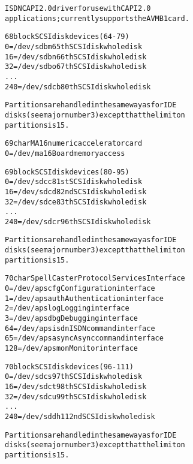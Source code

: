 \documentclass[a4paper,8pt,english]{sphinxmanual}
\begin{document}
\begin{alltt}
                ISDN CAPI 2.0 driver for use with CAPI 2.0
                applications; currently supports the AVM B1 card.

  68 block      SCSI disk devices (64-79)
                  0 = /dev/sdbm         65th SCSI disk whole disk
                 16 = /dev/sdbn         66th SCSI disk whole disk
                 32 = /dev/sdbo         67th SCSI disk whole disk
                    ...
                240 = /dev/sdcb         80th SCSI disk whole disk

                Partitions are handled in the same way as for IDE
                disks (see major number 3) except that the limit on
                partitions is 15.

  69 char       MA16 numeric accelerator card
                  0 = /dev/ma16         Board memory access

  69 block      SCSI disk devices (80-95)
                  0 = /dev/sdcc         81st SCSI disk whole disk
                 16 = /dev/sdcd         82nd SCSI disk whole disk
                 32 = /dev/sdce         83th SCSI disk whole disk
                    ...
                240 = /dev/sdcr         96th SCSI disk whole disk

                Partitions are handled in the same way as for IDE
                disks (see major number 3) except that the limit on
                partitions is 15.

  70 char       SpellCaster Protocol Services Interface
                  0 = /dev/apscfg       Configuration interface
                  1 = /dev/apsauth      Authentication interface
                  2 = /dev/apslog       Logging interface
                  3 = /dev/apsdbg       Debugging interface
                 64 = /dev/apsisdn      ISDN command interface
                 65 = /dev/apsasync     Async command interface
                128 = /dev/apsmon       Monitor interface

  70 block      SCSI disk devices (96-111)
                  0 = /dev/sdcs         97th SCSI disk whole disk
                 16 = /dev/sdct         98th SCSI disk whole disk
                 32 = /dev/sdcu         99th SCSI disk whole disk
                    ...
                240 = /dev/sddh         112nd SCSI disk whole disk

                Partitions are handled in the same way as for IDE
                disks (see major number 3) except that the limit on
                partitions is 15.


\end{alltt}
\end{document}
